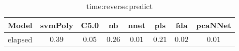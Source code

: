 \begin{table}[!ht]
	\centering
	\begin{tabular}{|c|c|c|c|c|c|c|c|}
		\hline
		Model & svmPoly & C5.0 & nb & nnet & pls & fda & pcaNNet \\ \hline
		elapsed & $0.39$ & $0.05$ & $0.26$ & $0.01$ & $0.21$ & $0.02$ & $0.01$ \\ \hline
	\end{tabular}
	\caption{time:reverse:predict}
	\label{tab:time:reverse:predict}
\end{table}
